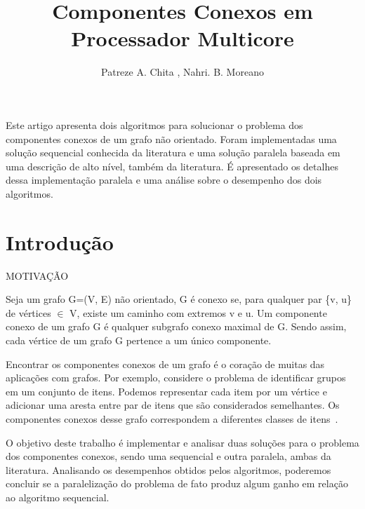 \documentclass[12pt]{article}
\title{Componentes Conexos em Processador Multicore}
\author{Patreze A. Chita \inst{1}, Nahri. B. Moreano\inst{1}}
\begin{document}
 

\maketitle

     
\begin{resumo} 
Este artigo apresenta dois algoritmos para solucionar o problema dos componentes conexos de um grafo não orientado. Foram implementadas uma solução sequencial conhecida da literatura e uma solução paralela baseada em uma descrição de alto nível, também da literatura. É apresentado os detalhes dessa implementação paralela e uma análise sobre o desempenho dos dois algoritmos.
\end{resumo}

\section{Introdução}
MOTIVAÇÃO

Seja um grafo G=(V, E) não orientado, G é conexo se, para qualquer par \{v, u\} de vértices $\in$ V, existe um caminho com extremos v e u. Um componente conexo de um grafo G é qualquer subgrafo conexo maximal de G. Sendo assim, cada vértice de um grafo G pertence a um único componente.

Encontrar os componentes conexos de um grafo é o coração de muitas das aplicações com grafos. Por exemplo, considere o problema de identificar grupos em um conjunto de itens. Podemos representar cada item por um vértice e adicionar uma aresta entre par de itens que são considerados semelhantes. Os componentes conexos desse grafo correspondem a diferentes classes de itens~\cite{Skiena:2008}.

O objetivo deste trabalho é implementar e analisar duas soluções para o problema dos componentes conexos, sendo uma sequencial e outra paralela, ambas da literatura. Analisando os desempenhos obtidos pelos algoritmos, poderemos concluir se a paralelização do problema de fato produz algum ganho em relação ao algoritmo sequencial.
\end{document}
